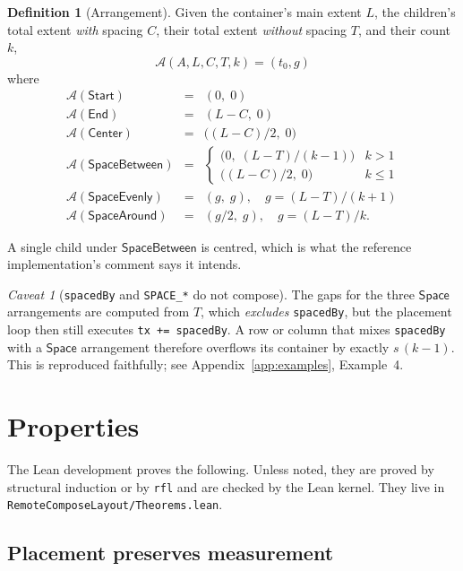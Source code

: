 \documentclass[11pt,a4paper]{article}
\newcommand{\Start}{\mathsf{Start}}
\newcommand{\Center}{\mathsf{Center}}
\newcommand{\End}{\mathsf{End}}
\newcommand{\SBetween}{\mathsf{SpaceBetween}}
\newcommand{\SEvenly}{\mathsf{SpaceEvenly}}
\newcommand{\SAround}{\mathsf{SpaceAround}}
\newcommand{\Aa}{\mathcal{A}}          %
\newcommand{\jv}[1]{\texttt{#1}}       %
\newcommand{\file}[1]{\texttt{#1}}
\theoremstyle{definition}
\newtheorem{definition}{Definition}[section]
\theoremstyle{plain}
\theoremstyle{remark}
\newtheorem{warning}{Caveat}[section]
\begin{document}
\begin{definition}[Arrangement]
Given the container's main extent $L$, the children's total extent \emph{with}
spacing $C$, their total extent \emph{without} spacing $T$, and their count $k$,
\[
  \Aa(A, L, C, T, k) = (t_0, g)
\]
where
\[
\begin{array}{lll}
  \Aa(\Start) &=& (0,\; 0) \\
  \Aa(\End) &=& (L - C,\; 0) \\
  \Aa(\Center) &=& \bigl((L - C)/2,\; 0\bigr) \\
  \Aa(\SBetween) &=& \begin{cases}
      \bigl(0,\; (L - T)/(k-1)\bigr) & k > 1 \\
      \bigl((L - C)/2,\; 0\bigr) & k \leq 1
    \end{cases} \\[10pt]
  \Aa(\SEvenly) &=& (g,\; g), \quad g = (L - T)/(k+1) \\[2pt]
  \Aa(\SAround) &=& (g/2,\; g), \quad g = (L - T)/k .
\end{array}
\]
\end{definition}

A single child under $\SBetween$ is centred, which is what the reference
implementation's comment says it intends.

\begin{warning}[\texttt{spacedBy} and \texttt{SPACE\_*} do not compose]
\label{sec:spacedquirk}
The gaps for the three $\mathsf{Space}$ arrangements are computed from $T$,
which \emph{excludes} \jv{spacedBy}, but the placement loop then still executes
\jv{tx += spacedBy}. A row or column that mixes \jv{spacedBy} with a
$\mathsf{Space}$ arrangement therefore overflows its container by exactly
$s\,(k-1)$. This is reproduced faithfully; see Appendix~\ref{app:examples},
Example~4.
\end{warning}

\section{Properties}
\label{sec:properties}

The Lean development proves the following. Unless noted, they are proved by
structural induction or by \jv{rfl} and are checked by the Lean kernel. They
live in \file{RemoteComposeLayout/Theorems.lean}.

\subsection{Placement preserves measurement}
\end{document}
